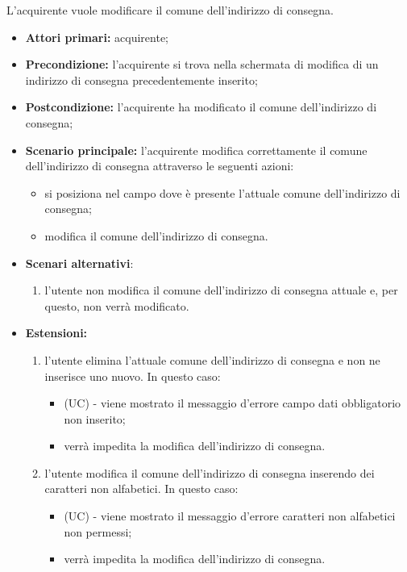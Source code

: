 L'acquirente vuole modificare il comune dell'indirizzo di consegna.
\begin{itemize}
    \item \textbf{Attori primari:} acquirente;
    \item \textbf{Precondizione:} l'acquirente si trova nella schermata di modifica di un indirizzo di consegna precedentemente inserito;
    \item \textbf{Postcondizione:} l'acquirente ha modificato il comune dell'indirizzo di consegna;
    \item \textbf{Scenario principale:} l'acquirente modifica correttamente il comune dell'indirizzo di consegna attraverso le seguenti azioni:
    \begin{itemize}
        \item si posiziona nel campo dove è presente l'attuale comune dell'indirizzo di consegna;
        \item modifica il comune dell'indirizzo di consegna.
    \end{itemize}
    \item \textbf{Scenari alternativi}:
    \begin{enumerate}[label=\lett]
        \item l'utente non modifica il comune dell'indirizzo di consegna attuale e, per questo, non verrà modificato.
    \end{enumerate}
    \item \textbf{Estensioni:}
    \begin{enumerate}[label=\lett]
        \item l'utente elimina l'attuale comune dell'indirizzo di consegna e non ne inserisce uno nuovo. In questo caso:
        \begin{itemize}
            \item (UC) - viene mostrato il messaggio d'errore campo dati obbligatorio non inserito;
            \item verrà impedita la modifica dell'indirizzo di consegna.
        \end{itemize}
        \item l'utente modifica il comune dell'indirizzo di consegna inserendo dei caratteri non alfabetici. In questo caso:
        \begin{itemize}
            \item (UC) - viene mostrato il messaggio d'errore caratteri non alfabetici non permessi;
            \item verrà impedita la modifica dell'indirizzo di consegna.
        \end{itemize}
    \end{enumerate}
\end{itemize}

